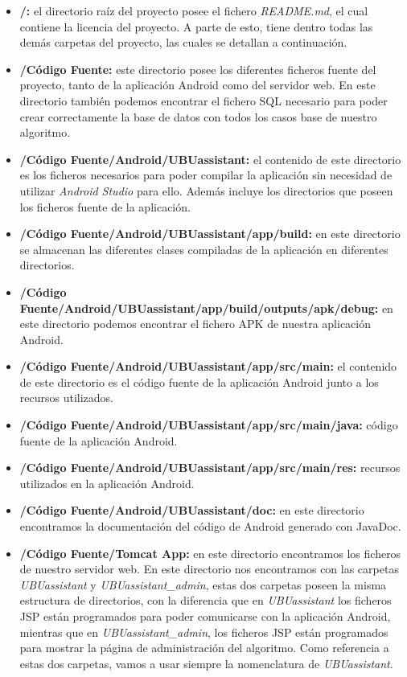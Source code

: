 \begin{itemize}
	\tightlist
	\item
	\textbf{/:} el directorio raíz del proyecto posee el fichero \textit{README.md}, el cual contiene la licencia del proyecto. A parte de esto, tiene dentro todas las demás carpetas del proyecto, las cuales se detallan a continuación.
	\item 
	\textbf{/Código Fuente:} este directorio posee los diferentes ficheros fuente del proyecto, tanto de la aplicación Android como del servidor web. En este directorio también podemos encontrar el fichero SQL necesario para poder crear correctamente la base de datos con todos los casos base de nuestro algoritmo.
	\item 
	\textbf{/Código Fuente/Android/UBUassistant:} el contenido de este directorio es los ficheros necesarios para poder compilar la aplicación sin necesidad de utilizar \textit{Android Studio} para ello. Además incluye los directorios que poseen los ficheros fuente de la aplicación.
	\item 
	\textbf{/Código Fuente/Android/UBUassistant/app/build:} en este directorio se almacenan las diferentes clases compiladas de la aplicación en diferentes directorios.
	\item 
	\textbf{/Código Fuente/Android/UBUassistant/app/build/outputs/apk/debug:} en este directorio podemos encontrar el fichero APK de nuestra aplicación Android.
	\item 
	\textbf{/Código Fuente/Android/UBUassistant/app/src/main:} el contenido de este directorio es el código fuente de la aplicación Android junto a los recursos utilizados.
	\item 
	\textbf{/Código Fuente/Android/UBUassistant/app/src/main/java:} código fuente de la aplicación Android.
	\item 
	\textbf{/Código Fuente/Android/UBUassistant/app/src/main/res:} recursos utilizados en la aplicación Android.
	\item 
	\textbf{/Código Fuente/Android/UBUassistant/doc:} en este directorio encontramos la documentación del código de Android generado con JavaDoc.
	\item 
	\textbf{/Código Fuente/Tomcat App:} en este directorio encontramos los ficheros de nuestro servidor web. En este directorio nos encontramos con las carpetas \textit{UBUassistant} y \textit{UBUassistant\_admin}, estas dos carpetas poseen la misma estructura de directorios, con la diferencia que en \textit{UBUassistant} los ficheros JSP están programados para poder comunicarse con la aplicación Android, mientras que en \textit{UBUassistant\_admin}, los ficheros JSP están programados para mostrar la página de administración del algoritmo. Como referencia a estas dos carpetas, vamos a usar siempre la nomenclatura de \textit{UBUassistant}.

\end{itemize}
